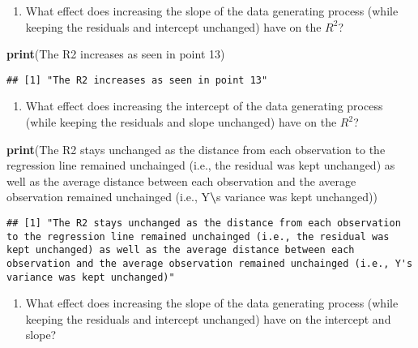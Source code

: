 \documentclass[
]{book}
\newenvironment{Shaded}{\begin{snugshade}}{\end{snugshade}}
\newcommand{\FunctionTok}[1]{\textcolor[rgb]{0.13,0.29,0.53}{\textbf{#1}}}
\newcommand{\NormalTok}[1]{#1}
\newcommand{\SpecialCharTok}[1]{\textcolor[rgb]{0.81,0.36,0.00}{\textbf{#1}}}
\newcommand{\StringTok}[1]{\textcolor[rgb]{0.31,0.60,0.02}{#1}}
\providecommand{\tightlist}{%
  \setlength{\itemsep}{0pt}\setlength{\parskip}{0pt}}
\begin{document}
\begin{enumerate}
\def\labelenumi{\roman{enumi}.}
\tightlist
\item
  What effect does increasing the slope of the data generating process (while keeping the residuals and intercept unchanged) have on the \(R^2\)?
\end{enumerate}

\begin{Shaded}
\begin{Highlighting}[]
\FunctionTok{print}\NormalTok{(}\StringTok{\textquotesingle{}The R2 increases as seen in point 13\textquotesingle{}}\NormalTok{)}
\end{Highlighting}
\end{Shaded}

\begin{verbatim}
## [1] "The R2 increases as seen in point 13"
\end{verbatim}

\begin{enumerate}
\def\labelenumi{\roman{enumi}.}
\setcounter{enumi}{1}
\tightlist
\item
  What effect does increasing the intercept of the data generating process (while keeping the residuals and slope unchanged) have on the \(R^2\)?
\end{enumerate}

\begin{Shaded}
\begin{Highlighting}[]
\FunctionTok{print}\NormalTok{(}\StringTok{\textquotesingle{}The R2 stays unchanged as the distance from each observation to the regression line remained unchainged (i.e., the residual was kept unchanged) as well as the average distance between each observation and the average observation remained unchainged (i.e., Y}\SpecialCharTok{\textbackslash{}\textquotesingle{}}\StringTok{s variance was kept unchanged)\textquotesingle{}}\NormalTok{)}
\end{Highlighting}
\end{Shaded}

\begin{verbatim}
## [1] "The R2 stays unchanged as the distance from each observation to the regression line remained unchainged (i.e., the residual was kept unchanged) as well as the average distance between each observation and the average observation remained unchainged (i.e., Y's variance was kept unchanged)"
\end{verbatim}

\begin{enumerate}
\def\labelenumi{\roman{enumi}.}
\setcounter{enumi}{2}
\tightlist
\item
  What effect does increasing the slope of the data generating process (while keeping the residuals and intercept unchanged) have on the intercept and slope?
\end{enumerate}
\end{document}
